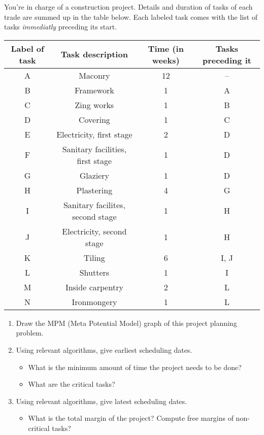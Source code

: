 \documentclass[12pt,a4paper]{article}
\begin{document}
\begin{question}
  You're in charge of a construction project. Details and duration of
  tasks of each trade are summed up in the table below. Each labeled
  task comes with the list of tasks \emph{immediatly} preceding its
  start.
    \vspace{2\baselineskip}
  \begin{center}
    \renewcommand{\arraystretch}{1.5}
    \begin{tabular}{|c|c|c|c|}
      \hline
      Label of task & Task description & Time (in weeks)  & Tasks preceding it \\
      \hline
      A  & Maconry & 12 & --   \\
      \hline
      B  & Framework & 1 & A  \\      
      \hline
      C  & Zing works & 1 & B  \\      
      \hline
      D  & Covering & 1 & C  \\      
      \hline
      E  & Electricity, first stage & 2 & D  \\      
      \hline
      F  & Sanitary facilities, first stage & 1 & D  \\      
      \hline
      G  & Glaziery & 1 & D  \\      
      \hline
      H  & Plastering & 4 & G  \\      
      \hline
      I  & Sanitary facilites, second stage & 1 & H  \\      
      \hline
      J  & Electricity, second stage & 1 & H  \\      
      \hline
      K  & Tiling & 6 & I, J  \\      
      \hline
      L  & Shutters & 1 & I  \\      
      \hline
      M  & Inside carpentry & 2 &  L \\           
      \hline
      N  & Ironmongery & 1 & L  \\      
      \hline
    \end{tabular}
  \end{center}
  \vspace{\baselineskip}
  \begin{enumerate}
  \item Draw the MPM (Meta Potential Model) graph of this project
    planning problem.
  \item Using relevant algorithms, give earliest scheduling dates. 
    \begin{itemize}
    \item What is the minimum amount of time the project needs to be done? 
    \item What are the critical tasks?
    \end{itemize}
  \item Using relevant algorithms, give latest scheduling dates.
    \begin{itemize}
    \item What is the total margin of the project? Compute free
      margins of non-critical tasks?
    \end{itemize}
  \end{enumerate}
\end{question}
\end{document}

